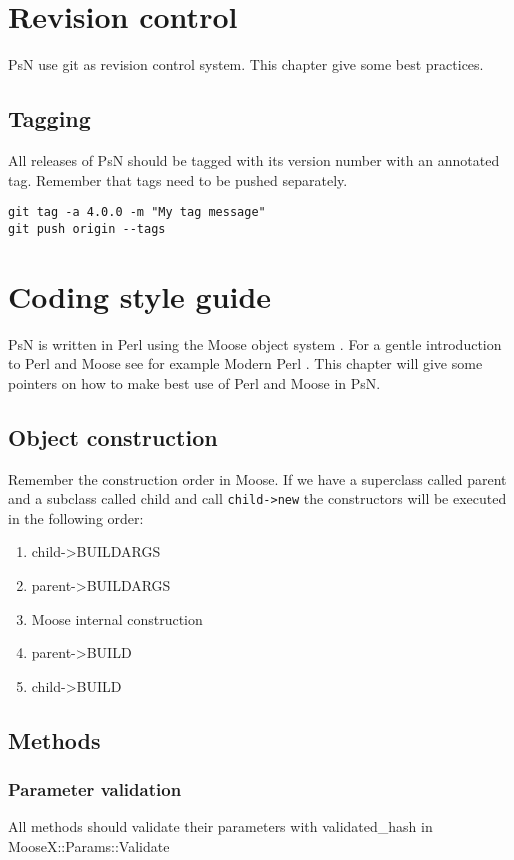 \section{Revision control}
PsN use git as revision control system. This chapter give some best practices.

\subsection{Tagging}
All releases of PsN should be tagged with its version number with an annotated tag. Remember
that tags need to be pushed separately.
\begin{verbatim}
git tag -a 4.0.0 -m "My tag message"
git push origin --tags
\end{verbatim}

\section{Coding style guide}
PsN is written in Perl using the Moose object system \cite{Moose}. For a gentle introduction to Perl and Moose see for example Modern Perl \cite{modern}. This chapter will give some pointers on how to make best use of Perl and Moose in PsN. 

\subsection{Object construction}

Remember the construction order in Moose. If we have a superclass called parent and a subclass called child and call \verb|child->new| the constructors will be executed in the following order:

\begin{enumerate}
	\item child->BUILDARGS
	\item parent->BUILDARGS
	\item Moose internal construction
	\item parent->BUILD
	\item child->BUILD
\end{enumerate}


\subsection{Methods}

\subsubsection{Parameter validation}
All methods should validate their parameters with validated\_hash in\\ \mbox{MooseX::Params::Validate}

